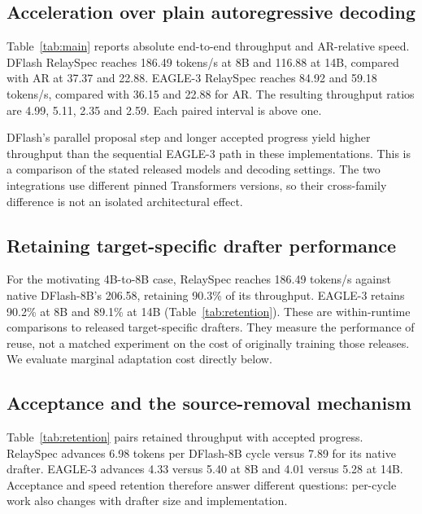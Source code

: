 \documentclass{article}
\begin{document}
\label{sec:results}

\subsection{Acceleration over plain autoregressive decoding}

Table~\ref{tab:main} reports absolute end-to-end throughput and AR-relative
speed. DFlash RelaySpec reaches 186.49 tokens/s at 8B and 116.88 at 14B,
compared with AR at 37.37 and 22.88. EAGLE-3 RelaySpec reaches 84.92 and
59.18 tokens/s, compared with 36.15 and 22.88 for AR. The resulting
throughput ratios are 4.99, 5.11, 2.35 and 2.59. Each paired interval is
above one.

\begin{table}[H]
\caption{MATH-500 end-to-end tokens/s, including prompt processing.
Progress R is mean recorded relay progress per cycle.
Ratios and intervals use the AR arm of that same run.
Native-drafter comparisons are in Table~\ref{tab:retention}.}
\label{tab:main}
\centering\small
\setlength{\tabcolsep}{4pt}

\end{table}

DFlash's parallel proposal step and longer accepted progress yield higher
throughput than the sequential EAGLE-3 path in these implementations.
This is a comparison of the stated released models and decoding settings.
The two integrations use different pinned Transformers versions, so their
cross-family difference is not an isolated architectural effect.

\subsection{Retaining target-specific drafter performance}
For the motivating 4B-to-8B case, RelaySpec reaches 186.49 tokens/s
against native DFlash-8B's 206.58, retaining 90.3\% of its throughput.
EAGLE-3 retains 90.2\% at 8B and 89.1\% at 14B
(Table~\ref{tab:retention}). These are within-runtime comparisons to
released target-specific drafters. They measure the performance of
reuse, not a matched experiment on the cost of originally training
those releases. We evaluate marginal adaptation cost directly below.

\subsection{Acceptance and the source-removal mechanism}

Table~\ref{tab:retention} pairs retained throughput with accepted progress.
RelaySpec advances 6.98 tokens per DFlash-8B cycle versus 7.89 for its
native drafter. EAGLE-3 advances 4.33 versus 5.40 at 8B and 4.01 versus
5.28 at 14B. Acceptance and speed retention therefore answer different
questions: per-cycle work also changes with drafter size and implementation.
\end{document}
